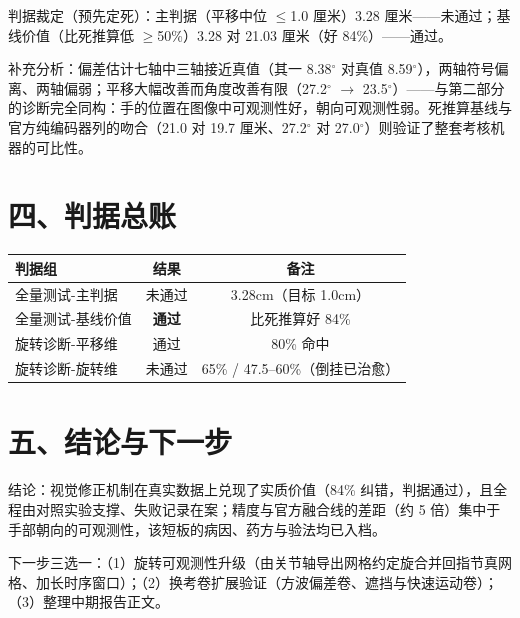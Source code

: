\documentclass{article}
\begin{document}
判据裁定（预先定死）：主判据（平移中位 $\leq$1.0 厘米）3.28 厘米——未通过；基线价值（比死推算低 $\geq$50\%）3.28 对 21.03 厘米（好 84\%）——通过。

补充分析：偏差估计七轴中三轴接近真值（其一 8.38$^\circ$ 对真值 8.59$^\circ$），两轴符号偏离、两轴偏弱；平移大幅改善而角度改善有限（27.2$^\circ$ $\to$ 23.5$^\circ$）——与第二部分的诊断完全同构：手的位置在图像中可观测性好，朝向可观测性弱。死推算基线与官方纯编码器列的吻合（21.0 对 19.7 厘米、27.2$^\circ$ 对 27.0$^\circ$）则验证了整套考核机器的可比性。

\section{四、判据总账}
\begin{table}[h]\centering
\begin{tabular}{lcc}
\toprule
判据组 & 结果 & 备注 \\
\midrule
全量测试-主判据 & 未通过 & 3.28cm（目标 1.0cm） \\
全量测试-基线价值 & \textbf{通过} & 比死推算好 84\% \\
旋转诊断-平移维 & 通过 & 80\% 命中 \\
旋转诊断-旋转维 & 未通过 & 65\% / 47.5--60\%（倒挂已治愈） \\
\bottomrule
\end{tabular}
\end{table}

\section{五、结论与下一步}
结论：视觉修正机制在真实数据上兑现了实质价值（84\% 纠错，判据通过），且全程由对照实验支撑、失败记录在案；精度与官方融合线的差距（约 5 倍）集中于手部朝向的可观测性，该短板的病因、药方与验法均已入档。

下一步三选一：（1）旋转可观测性升级（由关节轴导出网格约定旋合并回指节真网格、加长时序窗口）；（2）换考卷扩展验证（方波偏差卷、遮挡与快速运动卷）；（3）整理中期报告正文。
\end{document}
